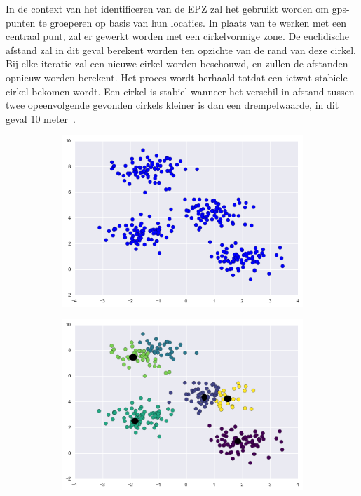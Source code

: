 In de context van het identificeren van de \ac{EPZ} zal het gebruikt worden om
\ac{gps}-punten te groeperen op basis van hun locaties. In plaats van te werken
met een centraal punt, zal er gewerkt worden met een cirkelvormige zone. De
euclidische afstand zal in dit geval berekent worden ten opzichte van de rand
van deze cirkel. Bij elke iteratie zal een nieuwe cirkel worden beschouwd, en
zullen de afstanden opnieuw worden berekent. Het proces wordt herhaald totdat
een ietwat stabiele cirkel bekomen wordt. Een cirkel is stabiel wanneer het
verschil in afstand tussen twee opeenvolgende gevonden cirkels kleiner is dan
een drempelwaarde, in dit geval 10 meter~\cite{Dhondt, Verdonck_2022}.
\begin{figure}[h]
    \centering
    \begin{subfigure}[b]{.33\textwidth}
        \centering
        \includegraphics[width=1\textwidth]{fig/kmeans/1.png}
    \end{subfigure}\hfill
    \begin{subfigure}[b]{.33\textwidth}
        \centering
        \includegraphics[width=1\textwidth]{fig/kmeans/2.png}

\end{subfigure}
\end{figure}
